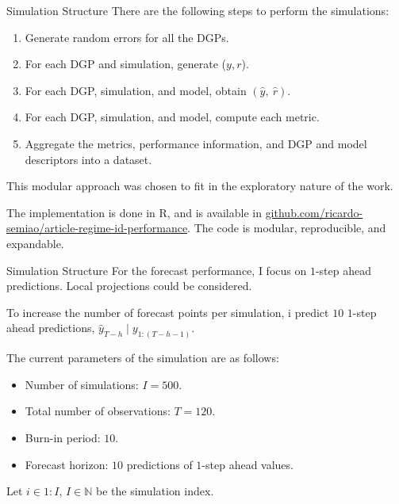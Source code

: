 \documentclass[
  ignorenonframetext,
]{beamer}
\providecommand{\tightlist}{%
  \setlength{\itemsep}{0pt}\setlength{\parskip}{0pt}}\usepackage{longtable,booktabs,array}
\begin{document}
\begin{frame}{Simulation Structure}
\label{simulation-structure}
There are the following steps to perform the simulations:

\begin{enumerate}
\tightlist
\item
  Generate random errors for all the DGPs.
\item
  For each DGP and simulation, generate (\(y, r\)).
\item
  For each DGP, simulation, and model, obtain \((\hat{y},~ \hat{r})\).
\item
  For each DGP, simulation, and model, compute each metric.
\item
  Aggregate the metrics, performance information, and DGP and model
  descriptors into a dataset.
\end{enumerate}

This modular approach was chosen to fit in the exploratory nature of the
work.

The implementation is done in R, and is available in
\href{https://github.com/ricardo-semiao/article-regime-id-performance}{github.com/ricardo-semiao/article-regime-id-performance}.
The code is modular, reproducible, and expandable.
\end{frame}

\begin{frame}{Simulation Structure}
\label{simulation-structure-1}
For the forecast performance, I focus on \(1\)-step ahead predictions.
Local projections could be considered.

To increase the number of forecast points per simulation, i predict
\(10\) \(1\)-step ahead predictions,
\(\hat{y}_{T-h} \mid y_{1:(T - h - 1)}\).

The current parameters of the simulation are as follows:

\begin{itemize}
\tightlist
\item
  Number of simulations: \(I = 500\).
\item
  Total number of observations: \(T = 120\).
\item
  Burn-in period: \(10\).
\item
  Forecast horizon: \(10\) predictions of \(1\)-step ahead values.
\end{itemize}

Let \(i \in 1:I\), \(I \in \mathbb{N}\) be the simulation index.
\end{frame}
\end{document}
